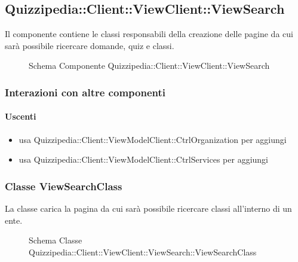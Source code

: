 \subsection{Quizzipedia::Client::ViewClient::ViewSearch}
Il componente contiene le classi responsabili della creazione delle pagine da cui sarà possibile ricercare domande, quiz e classi.
\begin{figure}[H]
\centering
\noindent{}
\caption[Schema Componente Quizzipedia::Client::ViewClient::ViewSearch]{Schema Componente Quizzipedia::Client::ViewClient::ViewSearch}
\end{figure}
\subsubsection{Interazioni con altre componenti}
\paragraph{Uscenti}
\begin{itemize}
\item usa Quizzipedia::Client::ViewModelClient::CtrlOrganization per aggiungi
\item usa Quizzipedia::Client::ViewModelClient::CtrlServices per aggiungi
\end{itemize}
\subsubsection{Classe ViewSearchClass}
La classe carica la pagina da cui sarà possibile ricercare classi all'interno di un ente.
\begin{figure}[H]
\centering
\noindent{}
\caption[Schema Classe ViewSearchClass]{Schema Classe Quizzipedia::Client::ViewClient::ViewSearch::ViewSearchClass}
\end{figure}
